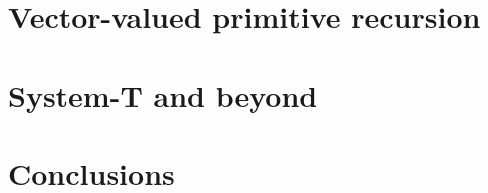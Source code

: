 \documentclass{jfp}
\begin{document}
\section{Vector-valued primitive recursion}
\label{sec:vect-valu-prim}

\section{System-T and beyond}
\label{sec:system-t-beyond}

\section{Conclusions}
\label{sec:conclusions}




\label{lastpage01}
\end{document}
